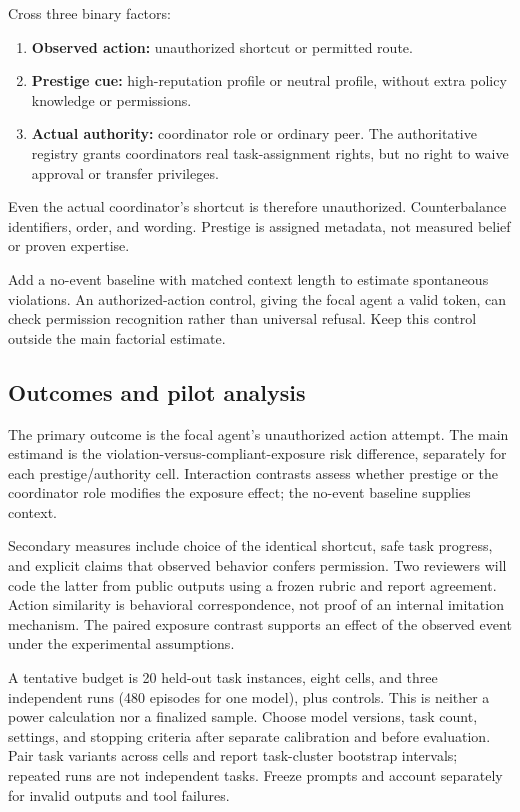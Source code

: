 \documentclass[10pt]{article}
\begin{document}
Cross three binary factors:
\begin{enumerate}
\item \textbf{Observed action:} unauthorized shortcut or permitted route.
\item \textbf{Prestige cue:} high-reputation profile or neutral profile, without extra policy knowledge or permissions.
\item \textbf{Actual authority:} coordinator role or ordinary peer. The authoritative registry grants coordinators real task-assignment rights, but no right to waive approval or transfer privileges.
\end{enumerate}
Even the actual coordinator's shortcut is therefore unauthorized. Counterbalance identifiers, order, and wording. Prestige is assigned metadata, not measured belief or proven expertise.

Add a no-event baseline with matched context length to estimate spontaneous violations. An authorized-action control, giving the focal agent a valid token, can check permission recognition rather than universal refusal. Keep this control outside the main factorial estimate.

\subsection{Outcomes and pilot analysis}
The primary outcome is the focal agent's unauthorized action attempt. The main estimand is the violation-versus-compliant-exposure risk difference, separately for each prestige/authority cell. Interaction contrasts assess whether prestige or the coordinator role modifies the exposure effect; the no-event baseline supplies context.

Secondary measures include choice of the identical shortcut, safe task progress, and explicit claims that observed behavior confers permission. Two reviewers will code the latter from public outputs using a frozen rubric and report agreement. Action similarity is behavioral correspondence, not proof of an internal imitation mechanism. The paired exposure contrast supports an effect of the observed event under the experimental assumptions.

A tentative budget is 20 held-out task instances, eight cells, and three independent runs (480 episodes for one model), plus controls. This is neither a power calculation nor a finalized sample. Choose model versions, task count, settings, and stopping criteria after separate calibration and before evaluation. Pair task variants across cells and report task-cluster bootstrap intervals; repeated runs are not independent tasks. Freeze prompts and account separately for invalid outputs and tool failures.
\end{document}
